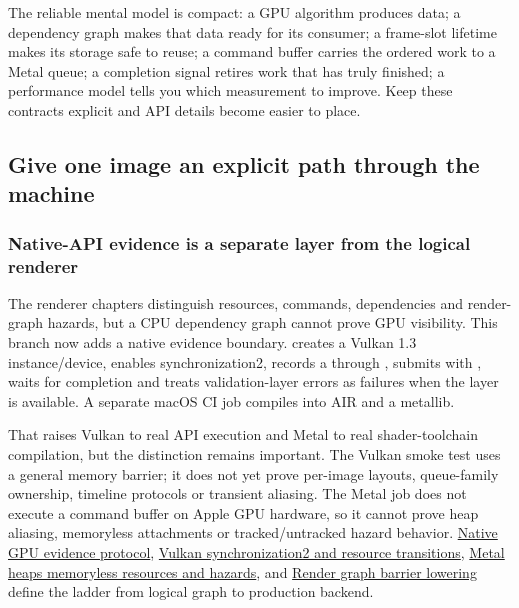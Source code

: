 The reliable mental model is compact: a GPU algorithm produces data; a dependency graph makes that data ready for its consumer; a frame-slot lifetime makes its storage safe to reuse; a command buffer carries the ordered work to a Metal queue; a completion signal retires work that has truly finished; a performance model tells you which measurement to improve. Keep these contracts explicit and API details become easier to place.

\subsection{Give one image an explicit path through the machine}\label{05-engine-i-ch019-give-one-image-an-explicit-path-through-the-machine}

\hypertarget{05-engine-i-ch019-give-one-image-an-explicit-path-through-the-machine}{}

\subsubsection{Native-API evidence is a separate layer from the logical renderer}\label{05-engine-i-ch019-native-api-evidence-is-a-separate-layer-from-the-logical-renderer}

\hypertarget{05-engine-i-ch019-native-api-evidence-is-a-separate-layer-from-the-logical-renderer}{}

The renderer chapters distinguish resources, commands, dependencies and render-graph hazards, but a CPU dependency graph cannot prove GPU visibility. This branch now adds a native evidence boundary.  creates a Vulkan 1.3 instance/device, enables synchronization2, records a  through , submits with , waits for completion and treats validation-layer errors as failures when the layer is available. A separate macOS CI job compiles  into AIR and a metallib.

That raises Vulkan to real API execution and Metal to real shader-toolchain compilation, but the distinction remains important. The Vulkan smoke test uses a general memory barrier; it does not yet prove per-image layouts, queue-family ownership, timeline protocols or transient aliasing. The Metal job does not execute a command buffer on Apple GPU hardware, so it cannot prove heap aliasing, memoryless attachments or tracked/untracked hazard behavior. \hyperref[appendix-1680333ac796]{Native GPU evidence protocol}, \hyperref[appendix-f15ce0d9c170]{Vulkan synchronization2 and resource transitions}, \hyperref[appendix-563b2cb23fc3]{Metal heaps memoryless resources and hazards}, and \hyperref[appendix-0fc95374cb7e]{Render graph barrier lowering} define the ladder from logical graph to production backend.

